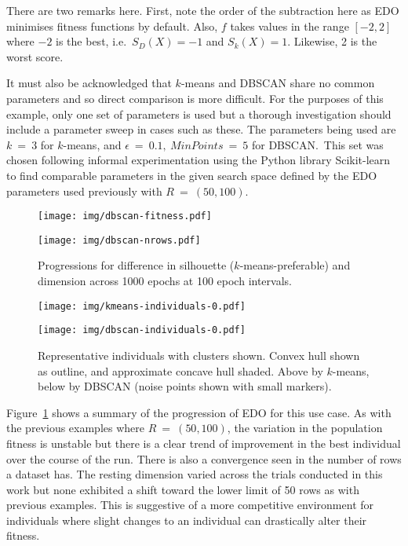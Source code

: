 There are two remarks here. First, note the order of the subtraction here as EDO
minimises fitness functions by default. Also, \(f\) takes values in the range
\([-2, 2]\) where \(-2\) is the best, i.e.\ \(S_D(X) = -1\) and \(S_k(X) = 1\).
Likewise, 2 is the worst score.

It must also be acknowledged that \(k\)-means and DBSCAN share no common
parameters and so direct comparison is more difficult. For the purposes of this
example, only one set of parameters is used but a thorough investigation should
include a parameter sweep in cases such as these. The parameters being used are
\(k~=~3\) for \(k\)-means, and \(\epsilon~=~0.1,\ MinPoints~=~5\) for DBSCAN.\
This set was chosen following informal experimentation using the Python library
Scikit-learn~\cite{scikit} to find comparable parameters in the given search
space defined by the EDO parameters used previously with \(R~=~(50,100)\).

\begin{figure}[htbp]
    \centering
    \begin{minipage}{\imgwidth}
        \centering
        \texttt{[image: img/dbscan-fitness.pdf]}
    \end{minipage}

    \begin{minipage}{\imgwidth}
        \centering
        \texttt{[image: img/dbscan-nrows.pdf]}
    \end{minipage}
    \caption{Progressions for difference in silhouette (\(k\)-means-preferable)
             and dimension across 1000 epochs at 100 epoch
             intervals.}\label{figure:dbscan-silhouette}
\end{figure}

\begin{figure}[htbp]
    \centering
    \texttt{[image: img/kmeans-individuals-0.pdf]}

    \texttt{[image: img/dbscan-individuals-0.pdf]}
    \caption{Representative individuals with clusters shown. Convex hull shown
             as outline, and approximate concave hull shaded. Above by
             \(k\)-means, below by DBSCAN (noise points shown with small
             markers).}\label{figure:dbscan-individuals}
\end{figure}

Figure~\ref{figure:dbscan-silhouette} shows a summary of the progression of EDO
for this use case. As with the previous examples where \(R~=~(50, 100)\), the
variation in the population fitness is unstable but there is a clear trend of
improvement in the best individual over the course of the run. There is also a
convergence seen in the number of rows a dataset has. The resting dimension
varied across the trials conducted in this work but none exhibited a shift
toward the lower limit of 50 rows as with previous examples. This is suggestive
of a more competitive environment for individuals where slight changes to an
individual can drastically alter their fitness.

